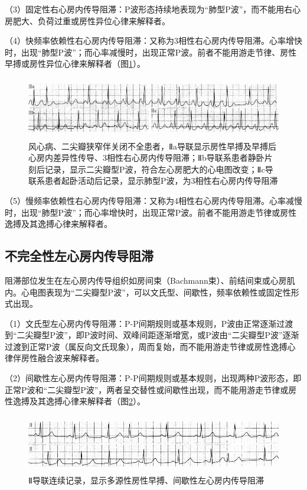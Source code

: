 （3）固定性右心房内传导阻滞：P波形态持续地表现为“肺型P波”，而不能用右心房肥大、负荷过重或房性异位心律来解释者。

（4）快频率依赖性右心房内传导阻滞：又称为3相性右心房内传导阻滞。心率增快时，出现“肺型P波”；而心率减慢时，出现正常P波。前者不能用游走节律、房性早搏或房性异位心律来解释者（图\ref{fig19-3}）。

\begin{figure}[!htbp]
 \centering
 \includegraphics[width=5.58333in,height=1.05208in]{./images/Image00319.jpg}
 \captionsetup{justification=centering}
 \caption{风心病、二尖瓣狭窄伴关闭不全患者，Ⅱa导联显示房性早搏及早搏后心房内差异性传导、3相性右心房内传导阻滞；Ⅱb导联系患者静卧片刻后记录，显示二尖瓣型P波，符合左心房肥大的心电图改变；Ⅱc导联系患者起卧活动后记录，显示肺型P波，为3相性右心房内传导阻滞}
 \label{fig19-3}
  \end{figure} 

（5）慢频率依赖性右心房内传导阻滞：又称为4相性右心房内传导阻滞。心率减慢时，出现“肺型P波”；而心率增快时，出现正常P波。前者不能用游走节律或房性逸搏及其逸搏心律来解释者。

\protect\hypertarget{text00026.htmlux5cux23subid316}{}{}

\subsection{不完全性左心房内传导阻滞}

阻滞部位发生在左心房内传导组织如房间束（Bachmann束）、前结间束或心房肌内。心电图表现为“二尖瓣型P波”，可以文氏型、间歇性，频率依赖性或固定性形式出现。

（1）文氏型左心房内传导阻滞：P-P间期规则或基本规则，P波由正常逐渐过渡到“二尖瓣型P波”，即P波时间、双峰间距逐渐增宽，或P波由“二尖瓣型P波”逐渐过渡到正常P波（属反向文氏现象），周而复始，而不能用游走节律或房性逸搏心律伴房性融合波来解释者。

（2）间歇性左心房内传导阻滞：P-P间期规则或基本规则，出现两种P波形态，即正常P波和“二尖瓣型P波”，两者呈交替性或间歇性出现，而不能用游走节律或房性逸搏及其逸搏心律来解释者（图\ref{fig19-4}）。

\begin{figure}[!htbp]
 \centering
 \includegraphics[width=5.58333in,height=1in]{./images/Image00320.jpg}
 \captionsetup{justification=centering}
 \caption{Ⅱ导联连续记录，显示多源性房性早搏、间歇性左心房内传导阻滞}
 \label{fig19-4}
  \end{figure} 

